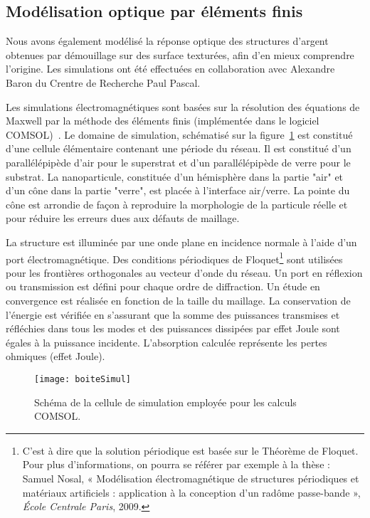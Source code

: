 	\subsection{Modélisation optique par éléments finis}
Nous avons également modélisé la réponse optique des structures d'argent obtenues par démouillage sur des surface texturées, afin d'en mieux comprendre l'origine. Les simulations ont été effectuées en collaboration avec Alexandre Baron du Crentre de Recherche Paul Pascal.\par 	
Les simulations électromagnétiques sont basées sur la résolution des équations de Maxwell par la méthode des éléments finis (implémentée dans le logiciel COMSOL)~\cite{kennedy2011analytical}. Le domaine de simulation, schématisé sur la figure~\ref{boiteSimul} est constitué d'une cellule élémentaire contenant une période du réseau. Il est constitué d'un parallélépipède d'air pour le superstrat et d'un parallélépipède de verre pour le substrat. La nanoparticule, constituée d'un hémisphère dans la partie "air" et d'un cône dans la partie "verre", est placée à l'interface air/verre. La pointe du cône est arrondie de façon à reproduire la morphologie de la particule réelle et pour réduire les erreurs dues aux défauts de maillage.\par 
La structure est illuminée par une onde plane en incidence normale à l'aide d'un port électromagnétique. Des conditions périodiques de Floquet\footnote{C'est à dire que la solution périodique est basée sur le Théorème de Floquet. Pour plus d'informations, on pourra se référer par exemple à la thèse : Samuel Nosal, « Modélisation électromagnétique de structures périodiques et matériaux artificiels : application à la conception d'un radôme passe-bande », \textit{École Centrale Paris}, 2009.} sont utilisées pour les frontières orthogonales au vecteur d'onde du réseau. Un port en réflexion ou transmission est défini pour chaque ordre de diffraction. Un étude en convergence est réalisée en fonction de la taille du maillage. La conservation de l'énergie est vérifiée en s'assurant que la somme des puissances transmises et réfléchies dans tous les modes et des puissances dissipées par effet Joule sont égales à la puissance incidente. L'absorption calculée représente les pertes ohmiques (effet Joule).\par 
\begin{figure}[!htb]
\centering
\texttt{[image: boiteSimul]}
\caption{Schéma de la cellule de simulation employée pour les calculs COMSOL.}
\label{boiteSimul}
\end{figure}

\newpage

